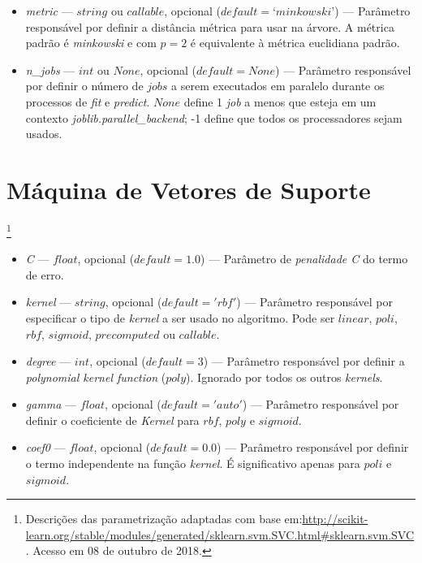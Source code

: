 \documentclass[
	12pt,				%
	oneside,			%
	a4paper,			%
	english,			%
	brazil				%
	]{abntex2ppgsi}
\begin{document}
{{{\begin{apendicesenv}
\begin{itemize}
\item \textit{metric} --- $string$ ou $callable$, opcional ($default = ‘minkowski’$) --- Parâmetro responsável por definir a distância métrica para usar na árvore. A métrica padrão é \textit{minkowski} e com $p = 2$ é equivalente à métrica euclidiana padrão. 

\item \textit{n\_jobs} --- $int$ ou $None$, opcional ($default = None$) --- Parâmetro responsável por definir o número de $jobs$ a serem executados em paralelo durante os processos de \textit{fit} e \textit{predict}. $None$ define 1 \textit{job} a menos que esteja em um contexto \textit{joblib.parallel\_backend}; -1 define que todos os processadores sejam usados.
\end{itemize}

\section{Máquina de Vetores de Suporte}\footnote{Descrições das parametrização adaptadas com base em:\url{http://scikit-learn.org/stable/modules/generated/sklearn.svm.SVC.html\#sklearn.svm.SVC}. Acesso em 08 de outubro de 2018.}

\begin{itemize}
\item \textit{C} --- $float$, opcional ($default=1.0$)
 --- Parâmetro de \textit{penalidade C} do termo de erro.
 
 \item \textit{kernel} --- $string$, opcional ($default='rbf'$) --- Parâmetro responsável por especificar o tipo de \textit{kernel} a ser usado no algoritmo. Pode ser $linear$, $poli$, $rbf$, $sigmoid$, $precomputed$ ou $callable$.

\item \textit{degree} --- $int$, opcional ($default=3$) --- Parâmetro responsável por definir a \textit{polynomial kernel function} ($poly$). Ignorado por todos os 
outros \textit{kernels}.

\item \textit{gamma} --- $float$, opcional ($default='auto'$) --- Parâmetro responsável por definir o coeficiente de \textit{Kernel} para $rbf$, $poly$ e $sigmoid$.

\item \textit{coef0} --- $float$, opcional ($default=0.0$) --- Parâmetro responsável por definir o termo independente na função \textit{kernel}. É significativo apenas para $poli$ e $sigmoid$.


\end{itemize}
\end{apendicesenv}}}}
\end{document}
